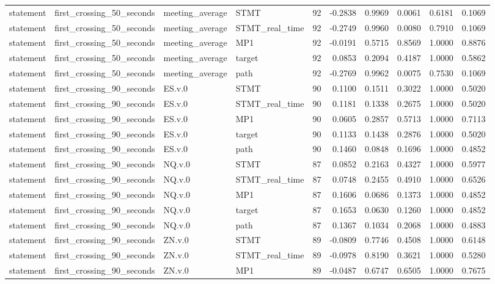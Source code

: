 \begin{tabular}{llllrrrrrr}
statement & first_crossing_50_seconds & meeting_average & STMT & 92 & -0.2838 & 0.9969 & 0.0061 & 0.6181 & 0.1069 \\
statement & first_crossing_50_seconds & meeting_average & STMT_real_time & 92 & -0.2749 & 0.9960 & 0.0080 & 0.7910 & 0.1069 \\
statement & first_crossing_50_seconds & meeting_average & MP1 & 92 & -0.0191 & 0.5715 & 0.8569 & 1.0000 & 0.8876 \\
statement & first_crossing_50_seconds & meeting_average & target & 92 & 0.0853 & 0.2094 & 0.4187 & 1.0000 & 0.5862 \\
statement & first_crossing_50_seconds & meeting_average & path & 92 & -0.2769 & 0.9962 & 0.0075 & 0.7530 & 0.1069 \\
statement & first_crossing_90_seconds & ES.v.0 & STMT & 90 & 0.1100 & 0.1511 & 0.3022 & 1.0000 & 0.5020 \\
statement & first_crossing_90_seconds & ES.v.0 & STMT_real_time & 90 & 0.1181 & 0.1338 & 0.2675 & 1.0000 & 0.5020 \\
statement & first_crossing_90_seconds & ES.v.0 & MP1 & 90 & 0.0605 & 0.2857 & 0.5713 & 1.0000 & 0.7113 \\
statement & first_crossing_90_seconds & ES.v.0 & target & 90 & 0.1133 & 0.1438 & 0.2876 & 1.0000 & 0.5020 \\
statement & first_crossing_90_seconds & ES.v.0 & path & 90 & 0.1460 & 0.0848 & 0.1696 & 1.0000 & 0.4852 \\
statement & first_crossing_90_seconds & NQ.v.0 & STMT & 87 & 0.0852 & 0.2163 & 0.4327 & 1.0000 & 0.5977 \\
statement & first_crossing_90_seconds & NQ.v.0 & STMT_real_time & 87 & 0.0748 & 0.2455 & 0.4910 & 1.0000 & 0.6526 \\
statement & first_crossing_90_seconds & NQ.v.0 & MP1 & 87 & 0.1606 & 0.0686 & 0.1373 & 1.0000 & 0.4852 \\
statement & first_crossing_90_seconds & NQ.v.0 & target & 87 & 0.1653 & 0.0630 & 0.1260 & 1.0000 & 0.4852 \\
statement & first_crossing_90_seconds & NQ.v.0 & path & 87 & 0.1367 & 0.1034 & 0.2068 & 1.0000 & 0.4883 \\
statement & first_crossing_90_seconds & ZN.v.0 & STMT & 89 & -0.0809 & 0.7746 & 0.4508 & 1.0000 & 0.6148 \\
statement & first_crossing_90_seconds & ZN.v.0 & STMT_real_time & 89 & -0.0978 & 0.8190 & 0.3621 & 1.0000 & 0.5280 \\
statement & first_crossing_90_seconds & ZN.v.0 & MP1 & 89 & -0.0487 & 0.6747 & 0.6505 & 1.0000 & 0.7675 \\

\end{tabular}
